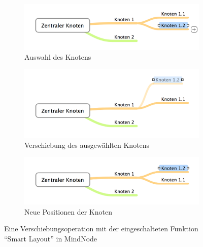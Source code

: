 
\begin{figure}[hbt]
    \newcommand{\subfigurewidth}{\textwidth}
    \newcommand{\graphicswidth}{0.8\linewidth}
    \begin{subfigure}{\subfigurewidth}
        \centering
        \includegraphics[width=\graphicswidth]{resources/mindnode-smart-layout-a}
        \caption{Auswahl des Knotens}
        \label{fig:mindnode-smart-layout-a}
    \end{subfigure}
    \begin{subfigure}{\subfigurewidth}
        \centering
        \includegraphics[width=\graphicswidth]{resources/mindnode-smart-layout-b}
        \caption{Verschiebung des ausgewählten Knotens}
        \label{fig:mindnode-smart-layout-b}
    \end{subfigure}
    \begin{subfigure}{\subfigurewidth}
        \centering
        \includegraphics[width=\graphicswidth]{resources/mindnode-smart-layout-c}
        \caption{Neue Positionen der Knoten}
        \label{fig:mindnode-smart-layout-c}
    \end{subfigure}
    \caption{Eine Verschiebungsoperation mit der eingeschalteten Funktion \enquote{Smart Layout} in MindNode}
    \label{fig:mindnode-smart-layout}
\end{figure}

